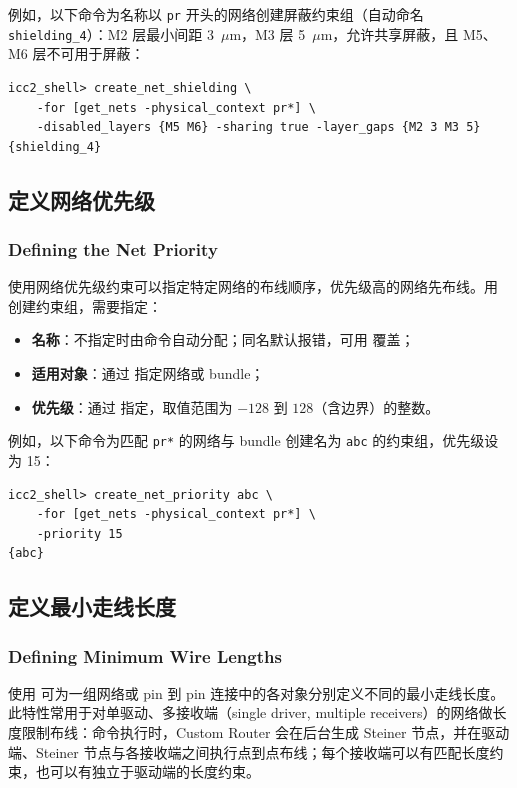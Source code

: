 例如，以下命令为名称以 \texttt{pr} 开头的网络创建屏蔽约束组（自动命名 \texttt{shielding\_4}）：M2 层最小间距 3~$\mu$m，M3 层 5~$\mu$m，允许共享屏蔽，且 M5、M6 层不可用于屏蔽：

\begin{lstlisting}
icc2_shell> create_net_shielding \
    -for [get_nets -physical_context pr*] \
    -disabled_layers {M5 M6} -sharing true -layer_gaps {M2 3 M3 5}
{shielding_4}
\end{lstlisting}

\subsection{定义网络优先级}
\subsubsection*{Defining the Net Priority}

使用网络优先级约束可以指定特定网络的布线顺序，优先级高的网络先布线。用  创建约束组，需要指定：
\begin{itemize}
  \item \textbf{名称}：不指定时由命令自动分配；同名默认报错，可用 \opt{-force} 覆盖；
  \item \textbf{适用对象}：通过  指定网络或 bundle；
  \item \textbf{优先级}：通过 \opt{-priority} 指定，取值范围为 $-128$ 到 $128$（含边界）的整数。
\end{itemize}

例如，以下命令为匹配 \texttt{pr*} 的网络与 bundle 创建名为 \texttt{abc} 的约束组，优先级设为 15：

\begin{lstlisting}
icc2_shell> create_net_priority abc \
    -for [get_nets -physical_context pr*] \
    -priority 15
{abc}
\end{lstlisting}

\subsection{定义最小走线长度}
\subsubsection*{Defining Minimum Wire Lengths}

使用  可为一组网络或 pin 到 pin 连接中的各对象分别定义不同的最小走线长度。此特性常用于对单驱动、多接收端（single driver, multiple receivers）的网络做长度限制布线：命令执行时，Custom Router 会在后台生成 Steiner 节点，并在驱动端、Steiner 节点与各接收端之间执行点到点布线；每个接收端可以有匹配长度约束，也可以有独立于驱动端的长度约束。

